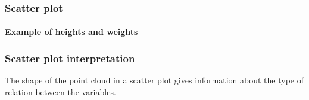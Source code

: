 \begin{frame}
\frametitle{Scatter plot}
\framesubtitle{Example of heights and weights}
\begin{center}
\end{center}
\end{frame}


\begin{frame}
\frametitle{Scatter plot interpretation}
The shape of the point cloud in a scatter plot gives information about the type of relation between the variables.

\resizebox{\textwidth}{!}{}
\end{frame}


